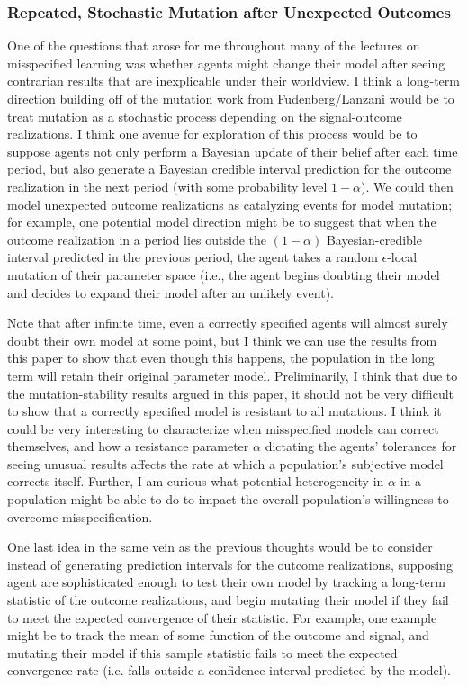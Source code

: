 \documentclass[10pt,letter]{article}
\begin{document}
\subsubsection*{Repeated, Stochastic Mutation after Unexpected Outcomes}
One of the questions that arose for me throughout many of the lectures on misspecified learning was whether agents might change their model after seeing contrarian results that are inexplicable under their worldview. I think a long-term direction building off of the mutation work from Fudenberg/Lanzani would be to treat mutation as a stochastic process depending on the signal-outcome realizations. I think one avenue for exploration of this process would be to suppose agents not only perform a Bayesian update of their belief after each time period, but also generate a Bayesian credible interval prediction for the outcome realization in the next period (with some probability level $1 - \alpha$). We could then model unexpected outcome realizations as catalyzing events for model mutation; for example, one potential model direction might be to suggest that when the outcome realization in a period lies outside the $(1-\alpha)$ Bayesian-credible interval predicted in the previous period, the agent takes a random $\epsilon$-local mutation of their parameter space (i.e., the agent begins doubting their model and decides to expand their model after an unlikely event).

Note that after infinite time, even a correctly specified agents will almost surely doubt their own model at some point, but I think we can use the results from this paper to show that even though this happens, the population in the long term will retain their original parameter model. Preliminarily, I think that due to the mutation-stability results argued in this paper, it should not be very difficult to show that a correctly specified model is resistant to all mutations. I think it could be very interesting to characterize when misspecified models can correct themselves, and how a resistance parameter $\alpha$ dictating the agents' tolerances for seeing unusual results affects the rate at which a population's subjective model corrects itself. Further, I am curious what potential heterogeneity in $\alpha$ in a population might be able to do to impact the overall population's willingness to overcome misspecification.

One last idea in the same vein as the previous thoughts would be to consider instead of generating prediction intervals for the outcome realizations, supposing agent are sophisticated enough to test their own model by tracking a long-term statistic of the outcome realizations, and begin mutating their model if they fail to meet the expected convergence of their statistic. For example, one example might be to track the mean of some function of the outcome and signal, and mutating their model if this sample statistic fails to meet the expected convergence rate (i.e. falls outside a confidence interval predicted by the model).
\end{document}
